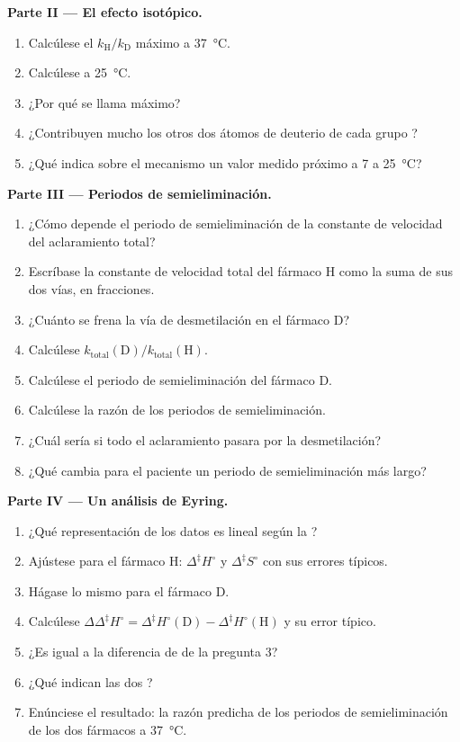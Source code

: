 \begin{problem}
\medskip\noindent\textbf{Parte II --- El efecto isotópico.}
\begin{enumerate}[resume]
  \item Calcúlese el $k_{\mathrm H}/k_{\mathrm D}$ máximo a \qty{37}{\celsius}.
  \item Calcúlese a \qty{25}{\celsius}.
  \item ¿Por qué se llama máximo?
  \item ¿Contribuyen mucho los otros dos átomos de deuterio de cada grupo ?
  \item ¿Qué indica sobre el mecanismo un valor medido próximo a 7 a \qty{25}{\celsius}?
\end{enumerate}

\medskip\noindent\textbf{Parte III --- Periodos de semieliminación.}
\begin{enumerate}[resume]
  \item ¿Cómo depende el periodo de semieliminación de la constante de velocidad del aclaramiento total?
  \item Escríbase la constante de velocidad total del fármaco H como la suma de sus dos
        vías, en fracciones.
  \item ¿Cuánto se frena la vía de desmetilación en el fármaco D?
  \item Calcúlese $k_{\mathrm{total}}(\mathrm D)/k_{\mathrm{total}}(\mathrm H)$.
  \item Calcúlese el periodo de semieliminación del fármaco D.
  \item Calcúlese la razón de los periodos de semieliminación.
  \item ¿Cuál sería si todo el aclaramiento pasara por la desmetilación?
  \item ¿Qué cambia para el paciente un periodo de semieliminación más largo?
\end{enumerate}

\medskip\noindent\textbf{Parte IV --- Un análisis de Eyring.}
\begin{enumerate}[resume]
  \item ¿Qué representación de los datos es lineal según la ?
  \item Ajústese para el fármaco H: $\Delta^{\ddagger}H^\circ$ y $\Delta^{\ddagger}S^\circ$ con sus errores típicos.
  \item Hágase lo mismo para el fármaco D.
  \item Calcúlese $\Delta\Delta^{\ddagger}H^\circ = \Delta^{\ddagger}H^\circ(\mathrm D) - \Delta^{\ddagger}H^\circ(\mathrm H)$ y su error típico.
  \item ¿Es igual a la diferencia de  de la pregunta 3?
  \item ¿Qué indican las dos ?
  \item Enúnciese el resultado: la razón predicha de los periodos de semieliminación de los dos fármacos
        a \qty{37}{\celsius}.
\end{enumerate}
\end{problem}
